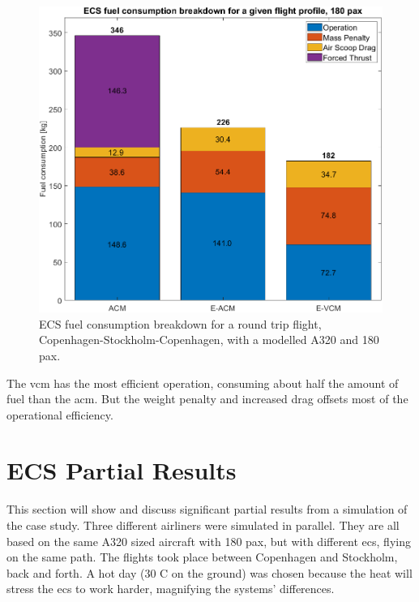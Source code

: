 \documentclass[english]{kththesis}
\begin{document}
\begin{figure}[!ht]
    \centering
    \includegraphics[width=1\textwidth]{Epictures/ECSFuelBreakDown180pax.png}
    \caption{ECS fuel consumption breakdown for a round trip flight, Copenhagen-Stockholm-Copenhagen, with a modelled A320 and 180 pax.}
    \label{fig:ECSfuelbreakdown}
\end{figure}

The \acrshort{vcm} has the most efficient operation, consuming about half the amount of fuel than the \acrshort{acm}. But the weight penalty and increased drag offsets most of the operational efficiency.



\clearpage
\section{ECS Partial Results}
\label{sec:ECSPartResult}

This section will show and discuss significant partial results from a simulation of the case study. Three different airliners were simulated in parallel. They are all based on the same A320 sized aircraft with 180 pax, but with different \acrshort{ecs}, flying on the same path. The flights took place between Copenhagen and Stockholm, back and forth. A hot day (30 \degree C on the ground) was chosen because the heat will stress the \acrshort{ecs} to work harder, magnifying the systems' differences. 
\end{document}
